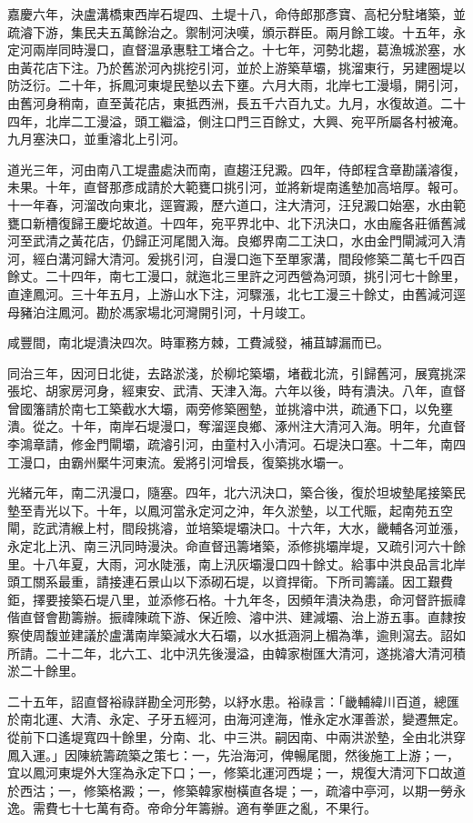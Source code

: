 \begin{pinyinscope}
嘉慶六年，決盧溝橋東西岸石堤四、土堤十八，命侍郎那彥寶、高杞分駐堵築，並疏濬下游，集民夫五萬餘治之。禦制河決嘆，頒示群臣。兩月餘工竣。十五年，永定河兩岸同時漫口，直督溫承惠駐工堵合之。十七年，河勢北趨，葛漁城淤塞，水由黃花店下注。乃於舊淤河內挑挖引河，並於上游築草壩，挑溜東行，另建圈堤以防泛衍。二十年，拆鳳河東堤民墊以去下壅。六月大雨，北岸七工漫塌，開引河，由舊河身稍南，直至黃花店，東抵西洲，長五千六百九丈。九月，水復故道。二十四年，北岸二工漫溢，頭工繼溢，側注口門三百餘丈，大興、宛平所屬各村被淹。九月塞決口，並重濬北上引河。

道光三年，河由南八工堤盡處決而南，直趨汪兒澱。四年，侍郎程含章勘議濬復，未果。十年，直督那彥成請於大範甕口挑引河，並將新堤南遙墊加高培厚。報可。十一年春，河溜改向東北，逕竇澱，歷六道口，注大清河，汪兒澱口始塞，水由範甕口新槽復歸王慶坨故道。十四年，宛平界北中、北下汛決口，水由龐各莊循舊減河至武清之黃花店，仍歸正河尾閭入海。良鄉界南二工決口，水由金門閘減河入清河，經白溝河歸大清河。爰挑引河，自漫口迤下至單家溝，間段修築二萬七千四百餘丈。二十四年，南七工漫口，就迤北三里許之河西營為河頭，挑引河七十餘里，直達鳳河。三十年五月，上游山水下注，河驟漲，北七工漫三十餘丈，由舊減河逕母豬泊注鳳河。勘於馮家場北河灣開引河，十月竣工。

咸豐間，南北堤潰決四次。時軍務方棘，工費減發，補苴罅漏而已。

同治三年，因河日北徙，去路淤淺，於柳坨築壩，堵截北流，引歸舊河，展寬挑深張坨、胡家房河身，經東安、武清、天津入海。六年以後，時有潰決。八年，直督曾國籓請於南七工築截水大壩，兩旁修築圈墊，並挑濬中洪，疏通下口，以免壅潰。從之。十年，南岸石堤漫口，奪溜逕良鄉、涿州注大清河入海。明年，允直督李鴻章請，修金門閘壩，疏濬引河，由童村入小清河。石堤決口塞。十二年，南四工漫口，由霸州檿牛河東流。爰將引河增長，復築挑水壩一。

光緒元年，南二汛漫口，隨塞。四年，北六汛決口，築合後，復於坦坡墊尾接築民墊至青光以下。十年，以鳳河當永定河之沖，年久淤墊，以工代賑，起南苑五空閘，訖武清緱上村，間段挑濬，並培築堤壩決口。十六年，大水，畿輔各河並漲，永定北上汛、南三汛同時漫決。命直督迅籌堵築，添修挑壩岸堤，又疏引河六十餘里。十八年夏，大雨，河水陡漲，南上汛灰壩漫口四十餘丈。給事中洪良品言北岸頭工關系最重，請接連石景山以下添砌石堤，以資捍衛。下所司籌議。因工艱費鉅，擇要接築石堤八里，並添修石格。十九年冬，因頻年潰決為患，命河督許振禕偕直督會勘籌辦。振禕陳疏下游、保近險、濬中洪、建減壩、治上游五事。直隸按察使周馥並建議於盧溝南岸築減水大石壩，以水抵涵洞上楣為準，逾則瀉去。詔如所請。二十二年，北六工、北中汛先後漫溢，由韓家樹匯大清河，遂挑濬大清河積淤二十餘里。

二十五年，詔直督裕祿詳勘全河形勢，以紓水患。裕祿言：「畿輔緯川百道，總匯於南北運、大清、永定、子牙五經河，由海河達海，惟永定水渾善淤，變遷無定。從前下口遙堤寬四十餘里，分南、北、中三洪。嗣因南、中兩洪淤墊，全由北洪穿鳳入運。」因陳統籌疏築之策七：一，先治海河，俾暢尾閭，然後施工上游；一，宜以鳳河東堤外大窪為永定下口；一，修築北運河西堤；一，規復大清河下口故道於西沽；一，修築格澱；一，修築韓家樹橫直各堤；一，疏濬中亭河，以期一勞永逸。需費七十七萬有奇。帝命分年籌辦。適有拳匪之亂，不果行。


\end{pinyinscope}
